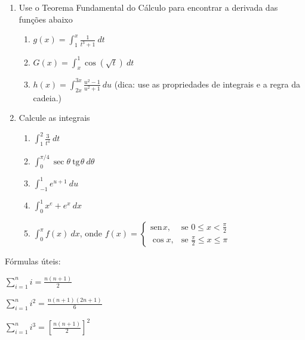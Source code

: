 \documentclass{article}
\providecommand{\sin}{} \renewcommand{\sin}{\mathrm{sen}\hspace{1pt}}
\providecommand{\tan}{} \renewcommand{\tan}{\mathrm{tg}\hspace{1pt}}
\begin{document}
\begin{enumerate}
\item Use o Teorema Fundamental do C\'alculo para encontrar a derivada das
	fun\c{c}\~oes abaixo

\begin{enumerate}[label=\alph*.]
	\item $\displaystyle g(x) = \int_1^x \frac{1}{t^3 + 1}\ dt$
	\item $\displaystyle G(x) = \int_x^1 \cos(\sqrt{t})\ dt$
	\item $\displaystyle h(x) = \int_{2x}^{3x} \frac{u^2 - 1}{u^2 + 1}\ du$ (dica: use as propriedades de integrais e a regra da cadeia.)
\end{enumerate}

\item Calcule as integrais

\begin{enumerate}[label=\alph*.]
	\item $\displaystyle\int_1^2 \frac{3}{t^4}\ dt$
	\item $\displaystyle\int_0^{\pi/4} \sec\theta\ \tan\theta\ d\theta$
	\item $\displaystyle\int_{-1}^1 e^{u+1}\ du$
	\item $\displaystyle\int_0^1 x^e + e^x\ dx$
	\item $\displaystyle\int_0^{\pi} f(x)\ dx$, onde $f(x) = \left\{
			\begin{array}{rl}
				\sin x, & \mbox{se } 0 \leqslant x < \frac{\pi}{2} \\
				\cos x, & \mbox{se } \frac{\pi}{2} \leqslant x \leqslant \pi
			\end{array}\right.$
\end{enumerate}

\end{enumerate}

F\'ormulas \'uteis:

$\displaystyle\sum_{i=1}^n i = \frac{n(n+1)}{2}$

$\displaystyle\sum_{i=1}^n i^2 = \frac{n(n+1)(2n+1)}{6}$

$\displaystyle\sum_{i=1}^n i^3 = \left[\frac{n(n+1)}{2}\right]^2$
\end{document}
